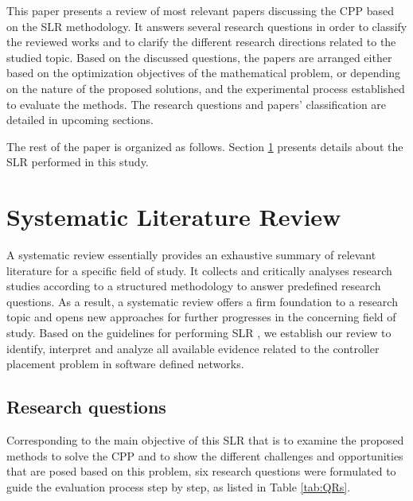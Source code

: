 \documentclass{IEEEtran}
\begin{document}
This paper presents a review of most relevant papers discussing the CPP based on the SLR methodology. It answers several research questions in order to classify the reviewed works and to clarify the different research directions related to the studied topic. Based on the discussed questions, the papers are arranged either based on the optimization objectives of the mathematical problem, or depending on the nature of the proposed solutions, and the experimental process established to evaluate the methods. The research questions and papers' classification are detailed in upcoming sections.


The rest of the paper is organized as follows. Section \ref{sec:SLR} presents details about the SLR performed in this study. 

\section{Systematic Literature Review}
\label{sec:SLR}

A systematic review essentially provides an exhaustive summary of relevant literature for a specific field of study. It collects and critically analyses research studies according to a structured methodology to answer predefined research questions. As a result, a systematic review offers a firm foundation to a research topic and opens new approaches for further progresses in the concerning field of study. Based on the guidelines for performing SLR \cite{KiCh07}, we establish our review to identify, interpret and analyze all available evidence related to the controller placement problem in software defined networks.


\subsection{Research questions}
Corresponding to the main objective of this SLR that is to examine the proposed methods to solve the CPP and to show the different challenges and opportunities that are posed based on this problem, six research questions were formulated to guide the evaluation process step by step, as listed in Table \ref{tab:QRs}.
\end{document}
